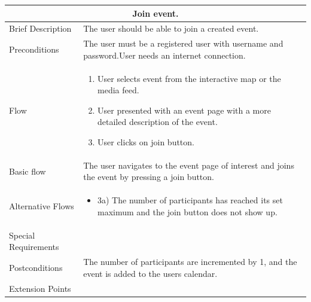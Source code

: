 \begin{minipage}{\linewidth}
\begin{tabular}{|l|p{85mm}|}
  \hline
  \multicolumn{2}{|c|}{\cellcolor{gray!25} \textbf{Join event.}} \\
  \hline
  Brief Description & The user should be able to join a created event.\\
  Preconditions & The user must be a registered user with username and password.User needs an internet connection.\\
  Flow &
    \begin{enumerate}
      \item User selects event from the interactive map or the media feed.
      \item User presented with an event page with a more detailed description of the event.
      \item User clicks on join button.
    \end{enumerate} \\
  Basic flow & The user navigates to the event page of interest and joins the event by pressing a join button.\\
  Alternative Flows & 
    \begin{itemize}
      \item 3a) The number of participants has reached its set maximum and the join button does not show up.
    \end{itemize} \\
  Special Requirements & \\
  Postconditions & The number of participants are incremented by 1, and the event is added to the users calendar.\\
  Extension Points & \\
  \hline
\end{tabular}
\end{minipage}

